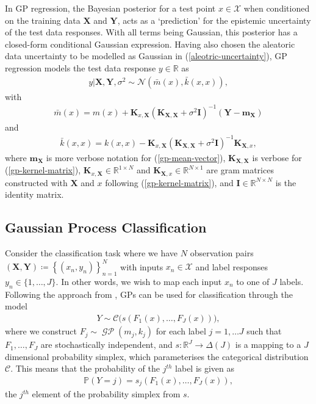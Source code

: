 \documentclass{article}
\newcommand{\GP}{\operatorname{\mathcal{GP}}}
\numberwithin{equation}{section}
\begin{document}
In GP regression, the Bayesian posterior for a test point $x \in \mathcal{X}$ when conditioned on the training data $\mathbf{X}$ and $\mathbf{Y}$, acts as a `prediction' for the epistemic uncertainty of the test data responses. 
With all terms being Gaussian, this posterior has a closed-form conditional Gaussian expression.
Having also chosen the aleatoric data uncertainty to be modelled as Gaussian in (\ref{aleotric-uncertainty}), GP regression models the test data response $y \in \mathbb{R}$ as
\begin{align}
    y \vert \mathbf{X}, \mathbf{Y}, \sigma^2
    \sim \mathcal{N}\left(\bar{m}(x), \bar{k}(x, x)\right),
    \label{gp-posterior-normal}
\end{align}
with
\begin{align}
    \label{gp-posterior-mean}
    \bar{m}(x) = m(x) + \mathbf{K}_{x, \mathbf{X}} \left(\mathbf{K}_{\mathbf{X}, \mathbf{X}} + \sigma^2 \mathbf{I}\right)^{-1} \left( \mathbf{Y} - \mathbf{m}_{\mathbf{X}}\right)
\end{align}
and
\begin{align}
    \label{gp-posterior-covariance}
    \bar{k}(x, x) = k(x, x) - \mathbf{K}_{x, \mathbf{X}} \left(\mathbf{K}_{\mathbf{X}, \mathbf{X}} + \sigma^2 \mathbf{I}\right)^{-1} \mathbf{K}_{\mathbf{X}, x},
\end{align}
where $\mathbf{m}_{\mathbf{X}}$ is more verbose notation for (\ref{gp-mean-vector}), $\mathbf{K}_{\mathbf{X}, \mathbf{X}}$ is verbose for (\ref{gp-kernel-matrix}), $\mathbf{K}_{x, \mathbf{X}} \in \mathbb{R}^{1 \times N}$ and $\mathbf{K}_{\mathbf{X}, x} \in \mathbb{R}^{N \times 1}$ are gram matrices constructed with $\mathbf{X}$ and $x$ following (\ref{gp-kernel-matrix}), and $\mathbf{I} \in \mathbb{R}^{N \times N}$ is the identity matrix.

\subsection{Gaussian Process Classification}
Consider the classification task where we have $N$ observation pairs $(\mathbf{X}, \mathbf{Y}) \coloneqq \left\{(x_n, y_n)\right\}_{n=1}^{N}$ with inputs $x_n \in \mathcal{X}$ and label responses $y_n \in \{1, \dots, J\}$. In other words, we wish to map each input $x_n$ to one of $J$ labels. Following the approach from \cite{matthews2017scalable}, GPs can be used for classification through the model
\begin{align}
    Y \sim \mathcal{C}\Big(s\left(F_1(x), \dots, F_J(x)\right)\Big),
    \label{gp-classifier}
\end{align}
where we construct $F_j \sim \GP\left(m_j, k_j\right)$ for each label $j=1, \dots J$ such that $F_1, \dots, F_J$ are stochastically independent, and $s: \mathbb{R}^J \rightarrow \Delta(J)$ is a mapping to a $J$ dimensional probability simplex, which parameterises the categorical distribution $\mathcal{C}$. 
This means that the probability of the $j^{th}$ label is given as
\begin{align}
    \mathbb{P}(Y=j) = s_j(F_1(x), \dots, F_J(x)),
\end{align}
the $j^{th}$ element of the probability simplex from $s$.
\end{document}
